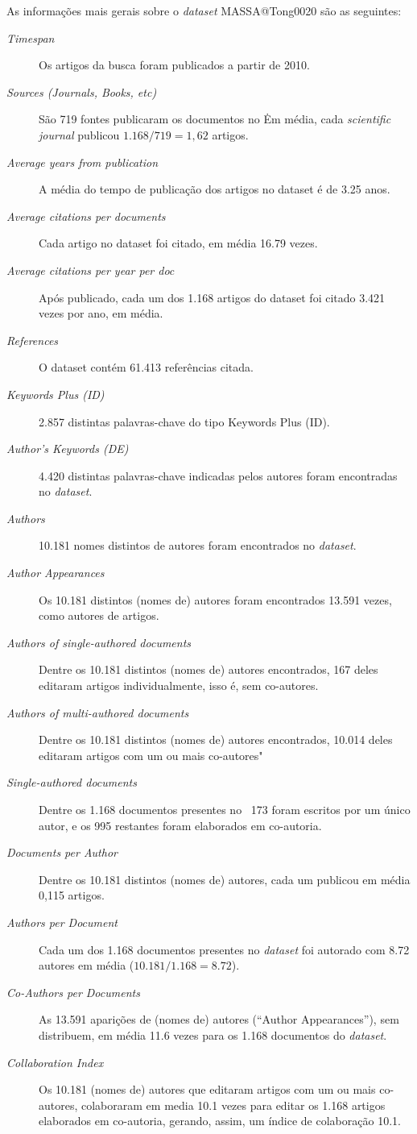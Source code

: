 As informações mais gerais sobre o \textit{dataset} MASSA@Tong0020 são as seguintes:
\begin{description}
    \item[\textit{Timespan}] Os artigos da busca foram publicados a partir de 2010.
    \item [\textit{Sources (Journals, Books, etc)}] São 719 fontes publicaram os documentos no \dataset\. Em média, cada \textit{scientific journal} publicou $1.168/719=1,62$ artigos.%
     \item [\textit{Average years from publication}] A média do tempo de publicação dos artigos no dataset é de 3.25 anos.
     \item [\textit{Average citations per documents}] Cada artigo no dataset foi citado, em média 16.79 vezes.
     \item [\textit{Average citations per year per doc}] Após publicado, cada um dos 1.168 artigos do dataset foi citado 3.421 vezes por ano, em média.
    \item [\textit{References}] O dataset contém 61.413 referências citada.
    \item [\textit{Keywords Plus (ID)}] 2.857 distintas palavras-chave do tipo Keywords Plus (ID).
    \item [\textit{Author's Keywords (DE)}] 4.420 distintas palavras-chave indicadas pelos autores foram encontradas no \textit{dataset}.
     \item [\textit{Authors}] 10.181 nomes distintos de autores foram encontrados no \textit{dataset}.
    \item [\textit{Author Appearances}] Os 10.181 distintos (nomes de) autores foram encontrados 13.591 vezes, como autores de artigos.
    \item [\textit{Authors of single-authored documents}] Dentre os 10.181 distintos (nomes de) autores encontrados, 167 deles editaram artigos individualmente, isso é, sem co-autores.
    \item [\textit{Authors of multi-authored documents}] Dentre os 10.181 distintos (nomes de) autores encontrados, 10.014 deles editaram artigos com um ou mais co-autores"
    \item [\textit{Single-authored documents}] Dentre os 1.168 documentos presentes no \dataset\, 173 foram escritos por um único autor, e os 995 restantes foram elaborados em co-autoria.
    \item [\textit{Documents per Author}] Dentre os 10.181 distintos (nomes de) autores, cada um publicou em média 0,115 artigos.
    \item [\textit{Authors per Document}] Cada um dos 1.168 documentos presentes no \textit{dataset}  foi autorado com 8.72 autores em média ($10.181 / 1.168 = 8.72$).
    \item [\textit{Co-Authors per Documents}] As 13.591 aparições de (nomes de) autores (``Author Appearances''), sem distribuem, em média 11.6 vezes para os 1.168 documentos do \textit{dataset}.
    \item [\textit{Collaboration Index}] Os 10.181 (nomes de) autores que editaram artigos com um ou mais co-autores, colaboraram em media 10.1 vezes para editar os 1.168 artigos elaborados em co-autoria, gerando, assim, um índice de colaboração 10.1. 
    

\end{description}
